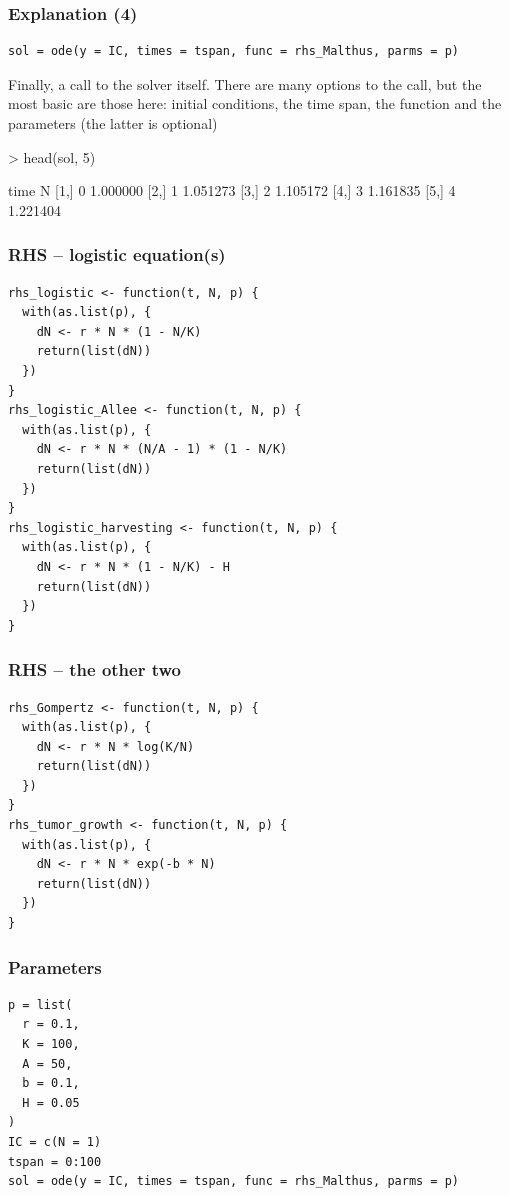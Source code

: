 \documentclass[aspectratio=169]{beamer}
\begin{document}
\begin{frame}[fragile]\frametitle{Explanation (4)}
\begin{lstlisting}
sol = ode(y = IC, times = tspan, func = rhs_Malthus, parms = p)
\end{lstlisting}
\vfill
Finally, a call to the solver itself. There are many options to the call, but the most basic are those here: initial conditions, the time span, the function and the parameters (the latter is optional)
\vfill
\begin{Schunk}
\begin{Sinput}
> head(sol, 5)
\end{Sinput}
\begin{Soutput}
     time        N
[1,]    0 1.000000
[2,]    1 1.051273
[3,]    2 1.105172
[4,]    3 1.161835
[5,]    4 1.221404
\end{Soutput}
\end{Schunk}
\end{frame}






\begin{frame}[fragile]\frametitle{RHS -- logistic equation(s)}
\begin{lstlisting}
rhs_logistic <- function(t, N, p) {
  with(as.list(p), {
    dN <- r * N * (1 - N/K)
    return(list(dN))
  })
}
rhs_logistic_Allee <- function(t, N, p) {
  with(as.list(p), {
    dN <- r * N * (N/A - 1) * (1 - N/K)
    return(list(dN))
  })
}
rhs_logistic_harvesting <- function(t, N, p) {
  with(as.list(p), {
    dN <- r * N * (1 - N/K) - H
    return(list(dN))
  })
}
\end{lstlisting}
\end{frame}

\begin{frame}[fragile]\frametitle{RHS -- the other two}
\begin{lstlisting}
rhs_Gompertz <- function(t, N, p) {
  with(as.list(p), {
    dN <- r * N * log(K/N)
    return(list(dN))
  })
}
rhs_tumor_growth <- function(t, N, p) {
  with(as.list(p), {
    dN <- r * N * exp(-b * N)
    return(list(dN))
  })
}
\end{lstlisting}
\end{frame}



\begin{frame}[fragile]\frametitle{Parameters}
\begin{lstlisting}
p = list(
  r = 0.1,
  K = 100,
  A = 50,
  b = 0.1,
  H = 0.05
)
IC = c(N = 1)
tspan = 0:100
sol = ode(y = IC, times = tspan, func = rhs_Malthus, parms = p)
\end{lstlisting}
\end{frame}
\end{document}
